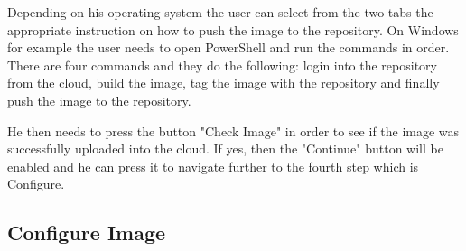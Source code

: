Depending on his operating system the user can select from the two tabs the appropriate instruction on how to push the image to the repository. On Windows for example the user needs to open PowerShell and run the commands in order. There are four commands and they do the following: login into the repository from the cloud, build the image, tag the image with the repository and finally push the image to the repository.

He then needs to press the button "Check Image" in order to see if the image was successfully uploaded into the cloud. If yes, then the "Continue" button will be enabled and he can press it to navigate further to the fourth step which is Configure.

\newpage

\subsection{Configure Image}
\label{chap:05:01:04}

